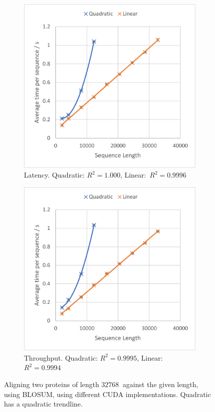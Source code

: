 \begin{figure}
    \centering
    \begin{subfigure}{.49\textwidth}
      \centering
      \includegraphics[width=\linewidth]{figs/eval/cu_spaces_ser.pdf}
      \caption{Latency. Quadratic: $R^2=1.000$, \mbox{Linear}:~${R^2=0.9996}$}
      \label{fig:CU_Spaces_Ser}
    \end{subfigure}
    \hfill
    \begin{subfigure}{.49\textwidth}
      \centering
      \includegraphics[width=\linewidth]{figs/eval/cu_spaces_il.pdf}
      \caption{Throughput. Quadratic: $R^2=0.9995$, \mbox{Linear}:~${R^2=0.9994}$}
      \label{fig:CU_Spaces_IL}
    \end{subfigure}
    \caption{Aligning two proteins of length $\SI{32768}{}$ against the given length, using BLOSUM, using different CUDA implementations. Quadratic has a quadratic trendline.}
    \label{fig:CU_Spaces}
\end{figure}

